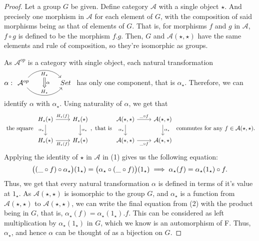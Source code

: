 \documentclass[18pt,a4paper]{article}
\theoremstyle{definition}
\begin{document}
	\begin{proof} \setcounter{equation}{0} Let a group $G$ be given.
		Define category $\mathcal{A}$ with a single object $\star$. And precisely one morphism
		in $\mathcal{A} $ for each element of $G$, with the composition of said morphisms
		being as that of elements of $G$.
		That is, for morphisms $f$ and $g$ in $\mathcal{A}$, $f \circ g$ is defined to
		be the morphism $f.g$. Then, $G$ and $\mathcal{A}(\star, \star)$ have the
		same elements
		and rule of composition, so they're isomorphic as groups.

		As $\mathcal{A} ^{op}$ is a category with single object,
		 each natural transformation $\alpha:
		\begin{tikzcd}[row sep=small, column sep=large]
			\mathcal{A} ^{op} \arrow[r,bend left=50, "H_\star"{name=U, below}]
			\arrow[r, bend right = 50, "H_\star"{name=D, above}]
& Set
\arrow[Rightarrow, from=U , to=D, "\alpha"]
		\end{tikzcd}$
		has only one component, that is $\alpha_\star$. Therefore, we can
		identify $\alpha$ with $\alpha_\star$.
		Using naturality of $\alpha$, we get that
		\begin{equation}
			\text{ the square }
			\begin{tikzcd}
				H_\star(\star) \arrow[swap]{d}{\alpha_\star} \arrow{r}{H_\star(f)}
			& H_\star(\star) \arrow{d}{\alpha_\star}\\
			H_\star(\star) \arrow[swap]{r}{H_\star(f)}
			& H_\star(\star)
			\end{tikzcd}
			, \text{ that is }
			\begin{tikzcd}
				\mathcal{A} (\star,\star) \arrow[swap]{d}{\alpha_\star} \arrow{r}{\string _ \circ f}
			& \mathcal{A} (\star,\star) \arrow{d}{\alpha_\star}\\
			\mathcal{A} (\star,\star) \arrow[swap]{r}{ \string _ \circ f}
			& \mathcal{A} (\star,\star)
			\end{tikzcd}
			\text{ commutes for any } f \in \mathcal{A}(\star,\star).
		\end{equation}
		Applying the identity of $\star$ in $\mathcal{A}$ in (1)
		gives us the following equation:
		\begin{equation}
			\big( (\string _ \circ f) \circ \alpha_\star \big)(1_\star) =
			\big(  \alpha_\star \circ (\string _ \circ f)\big)(1_\star)
			\implies \alpha_\star(f)=\alpha_\star(1_\star) \circ f.
		\end{equation}
		Thus, we get that every natural transformation
		$\alpha$ is defined in terms of it's value at $1_\star$.
		As $\mathcal{A} (\star, \star)$ is isomorphic to the group $G$, and
		$\alpha_\star$ is a function from $\mathcal{A} (\star,\star)$
		to $\mathcal{A} (\star,\star)$, we can write
		the final equation from (2) with the product being in $G$, that is,
		 $\alpha_\star(f)=\alpha_\star(1_\star).f$.
		 This can be considered as left multiplication by $\alpha_\star(1_\star)$ in $G$, which
		 we know is an automorphism of F. Thus, $\alpha_\star$, and hence $\alpha$
		 can be thought of as a bijection on $G$.


\end{proof}
\end{document}
